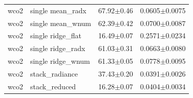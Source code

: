 {\begin{longtable}{llrr}
wco2 & single mean\_radx & 67.92$\pm$0.46 & 0.0605$\pm$0.0075 \\
wco2 & single mean\_wnum & 62.39$\pm$0.42 & 0.0700$\pm$0.0087 \\
wco2 & single ridge\_flat & 16.49$\pm$0.07 & 0.2571$\pm$0.0234 \\
wco2 & single ridge\_radx & 61.03$\pm$0.31 & 0.0663$\pm$0.0080 \\
wco2 & single ridge\_wnum & 61.33$\pm$0.05 & 0.0778$\pm$0.0095 \\
wco2 & stack\_radiance & 37.43$\pm$0.20 & 0.0391$\pm$0.0026 \\
wco2 & stack\_reduced & 16.28$\pm$0.07 & 0.0404$\pm$0.0034 \\
\end{longtable}}
